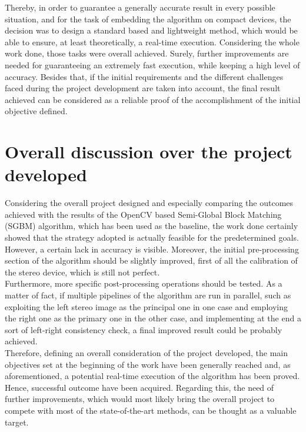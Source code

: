 Thereby, in order to guarantee a generally accurate result in every possible situation, and for the task of embedding the algorithm on compact devices, the decision was to design a standard based and lightweight method, which would be able to ensure, at least theoretically, a real-time execution.
Considering the whole work done, those tasks were overall achieved.
Surely, further improvements are needed for guaranteeing an extremely fast execution, while keeping a high level of accuracy.
Besides that, if the initial requirements and the different challenges faced during the project development are taken into account, the final result achieved can be considered as a reliable proof of the accomplishment of the initial objective defined.

\section{Overall discussion over the project developed}
\label{section:overall-discussion}

Considering the overall project designed and especially comparing the outcomes achieved with the results of the OpenCV based Semi-Global Block Matching (SGBM) algorithm, which has been used as the baseline, the work done certainly showed that the strategy adopted is actually feasible for the predetermined goals.\\
However, a certain lack in accuracy is visible.
Moreover, the initial pre-processing section of the algorithm should be slightly improved, first of all the calibration of the stereo device, which is still not perfect. \\
Furthermore, more specific post-processing operations should be tested.
As a matter of fact, if multiple pipelines of the algorithm are run in parallel, such as exploiting the left stereo image as the principal one in one case and employing the right one as the primary one in the other case, and implementing at the end a sort of left-right consistency check, a final improved result could be probably achieved. \\
Therefore, defining an overall consideration of the project developed, the main objectives set at the beginning of the work have been generally reached and, as aforementioned, a potential real-time execution of the algorithm has been proved.\\
Hence, successful outcome have been acquired.
Regarding this, the need of further improvements, which would most likely bring the overall project to compete with most of the state-of-the-art methods, can be thought as a valuable target. 


